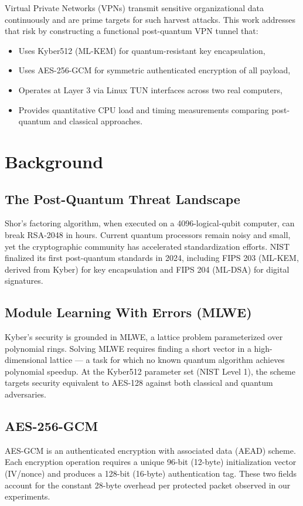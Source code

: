 \documentclass[conference]{IEEEtran}
\begin{document}
Virtual Private Networks (VPNs) transmit sensitive organizational data continuously and are prime targets for such harvest attacks. This work addresses that risk by constructing a functional post-quantum VPN tunnel that:
\begin{itemize}
    \item Uses Kyber512 (ML-KEM) for quantum-resistant key encapsulation,
    \item Uses AES-256-GCM for symmetric authenticated encryption of all payload,
    \item Operates at Layer 3 via Linux TUN interfaces across two real computers,
    \item Provides quantitative CPU load and timing measurements comparing post-quantum and classical approaches.
\end{itemize}

\section{Background}

\subsection{The Post-Quantum Threat Landscape}
Shor's factoring algorithm, when executed on a 4096-logical-qubit computer, can break RSA-2048 in hours. Current quantum processors remain noisy and small, yet the cryptographic community has accelerated standardization efforts. NIST finalized its first post-quantum standards in 2024, including FIPS 203 (ML-KEM, derived from Kyber) for key encapsulation and FIPS 204 (ML-DSA) for digital signatures.

\subsection{Module Learning With Errors (MLWE)}
Kyber's security is grounded in MLWE, a lattice problem parameterized over polynomial rings. Solving MLWE requires finding a short vector in a high-dimensional lattice — a task for which no known quantum algorithm achieves polynomial speedup. At the Kyber512 parameter set (NIST Level 1), the scheme targets security equivalent to AES-128 against both classical and quantum adversaries.

\subsection{AES-256-GCM}
AES-GCM is an authenticated encryption with associated data (AEAD) scheme. Each encryption operation requires a unique 96-bit (12-byte) initialization vector (IV/nonce) and produces a 128-bit (16-byte) authentication tag. These two fields account for the constant 28-byte overhead per protected packet observed in our experiments.
\end{document}
